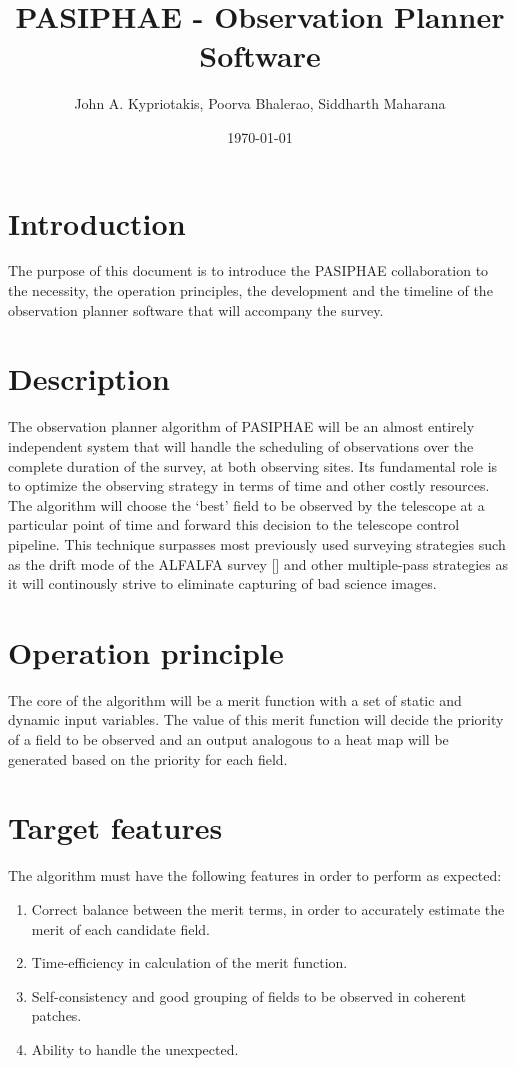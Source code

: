 \documentclass{article}
\title{PASIPHAE - Observation Planner Software}
\author{John A. Kypriotakis, Poorva Bhalerao, Siddharth Maharana}
\date{\today}
\begin{document}
\maketitle

\section{Introduction}
The purpose of this document is to introduce the PASIPHAE collaboration to the necessity, the operation principles, the development and the timeline of the observation planner software that will accompany the survey.

\section{Description}
The observation planner algorithm of PASIPHAE will be an almost entirely independent system that will handle the scheduling of observations over the complete duration of the survey, at both observing sites. Its fundamental role is to optimize the observing strategy in terms of time and other costly resources. The algorithm will choose the ‘best’ field to be observed by the telescope at a particular point of time and forward this decision to the telescope control pipeline. This technique surpasses most previously used surveying strategies such as the drift mode of the ALFALFA survey [\cite{Giovanelli2005}] and other multiple-pass strategies as it will continously strive to eliminate capturing of bad science images. 

\section{Operation principle}
The core of the algorithm will be a merit function with a set of static and dynamic input variables. The value of this merit function will decide the priority of a field to be observed and an output analogous to a heat map will be generated based on the priority for each field.

\section{Target features}
The algorithm must have the following features in order to perform as expected:
\begin{enumerate}
\item Correct balance between the merit terms, in order to accurately estimate the merit of each candidate field.
\item Time-efficiency in calculation of the merit function.
\item Self-consistency and good grouping of fields to be observed in coherent patches.
\item Ability to handle the unexpected.
\end{enumerate}
\end{document}
